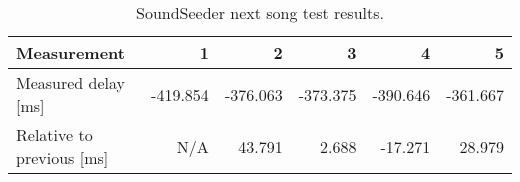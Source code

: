 \begin{table}[ht]
\centering
\begin{tabular}{|l|r|r|r|r|r|}
\hline
Measurement          		& 1       	& 2       	& 3       & 4       & 5       \\ \hline
Measured delay [ms]       	& -419.854 	& -376.063 	& -373.375 & -390.646 & -361.667 \\ \hline
Relative to previous [ms] 	& N/A     	& 43.791 	& 2.688  & -17.271  & 28.979  \\ \hline
\end{tabular}
\caption{SoundSeeder next song test results.}
\label{fig:soundseedernextsongfigure}
\end{table}
